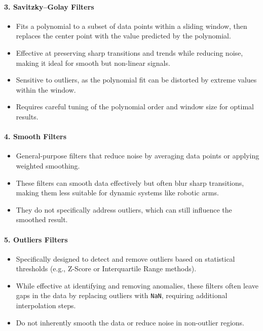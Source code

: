 \documentclass[12pt]{article}
\begin{document}
\paragraph{3. Savitzky–Golay Filters}
\begin{itemize}
    \item Fits a polynomial to a subset of data points within a sliding window, then replaces the center point with the value predicted by the polynomial.
    \item Effective at preserving sharp transitions and trends while reducing noise, making it ideal for smooth but non-linear signals.
    \item Sensitive to outliers, as the polynomial fit can be distorted by extreme values within the window.
    \item Requires careful tuning of the polynomial order and window size for optimal results.
\end{itemize}

\paragraph{4. Smooth Filters}
\begin{itemize}
    \item General-purpose filters that reduce noise by averaging data points or applying weighted smoothing.
    \item These filters can smooth data effectively but often blur sharp transitions, making them less suitable for dynamic systems like robotic arms.
    \item They do not specifically address outliers, which can still influence the smoothed result.
\end{itemize}

\paragraph{5. Outliers Filters}
\begin{itemize}
    \item Specifically designed to detect and remove outliers based on statistical thresholds (e.g., Z-Score or Interquartile Range methods).
    \item While effective at identifying and removing anomalies, these filters often leave gaps in the data by replacing outliers with \texttt{NaN}, requiring additional interpolation steps.
    \item Do not inherently smooth the data or reduce noise in non-outlier regions.
\end{itemize}
\end{document}

